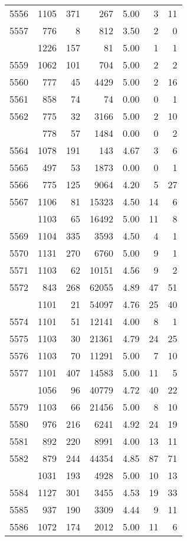 \documentclass[
]{article}
\begin{document}
\begin{table}
\begin{tabular}[t]{lrrrrrr}
5556 & 1105 & 371 & 267 & 5.00 & 3 & 11\\
5557 & 776 & 8 & 812 & 3.50 & 2 & 0\\
\addlinespace
5558 & 1226 & 157 & 81 & 5.00 & 1 & 1\\
5559 & 1062 & 101 & 704 & 5.00 & 2 & 2\\
5560 & 777 & 45 & 4429 & 5.00 & 2 & 16\\
5561 & 858 & 74 & 74 & 0.00 & 0 & 1\\
5562 & 775 & 32 & 3166 & 5.00 & 2 & 10\\
\addlinespace
5563 & 778 & 57 & 1484 & 0.00 & 0 & 2\\
5564 & 1078 & 191 & 143 & 4.67 & 3 & 6\\
5565 & 497 & 53 & 1873 & 0.00 & 0 & 1\\
5566 & 775 & 125 & 9064 & 4.20 & 5 & 27\\
5567 & 1106 & 81 & 15323 & 4.50 & 14 & 6\\
\addlinespace
5568 & 1103 & 65 & 16492 & 5.00 & 11 & 8\\
5569 & 1104 & 335 & 3593 & 4.50 & 4 & 1\\
5570 & 1131 & 270 & 6760 & 5.00 & 9 & 1\\
5571 & 1103 & 62 & 10151 & 4.56 & 9 & 2\\
5572 & 843 & 268 & 62055 & 4.89 & 47 & 51\\
\addlinespace
5573 & 1101 & 21 & 54097 & 4.76 & 25 & 40\\
5574 & 1101 & 51 & 12141 & 4.00 & 8 & 1\\
5575 & 1103 & 30 & 21361 & 4.79 & 24 & 25\\
5576 & 1103 & 70 & 11291 & 5.00 & 7 & 10\\
5577 & 1101 & 407 & 14583 & 5.00 & 11 & 5\\
\addlinespace
5578 & 1056 & 96 & 40779 & 4.72 & 40 & 22\\
5579 & 1103 & 66 & 21456 & 5.00 & 8 & 10\\
5580 & 976 & 216 & 6241 & 4.92 & 24 & 19\\
5581 & 892 & 220 & 8991 & 4.00 & 13 & 11\\
5582 & 879 & 244 & 44354 & 4.85 & 87 & 71\\
\addlinespace
5583 & 1031 & 193 & 4928 & 5.00 & 10 & 13\\
5584 & 1127 & 301 & 3455 & 4.53 & 19 & 33\\
5585 & 937 & 190 & 3309 & 4.44 & 9 & 11\\
5586 & 1072 & 174 & 2012 & 5.00 & 11 & 6\\

\end{tabular}
\end{table}
\end{document}
